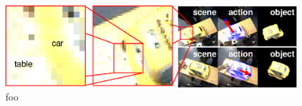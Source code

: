 




\begin{figure}[tbh]
  \centerline{\includegraphics[width=\textwidth]{fig-double-yellow}}
  \caption{foo} 
\end{figure}


